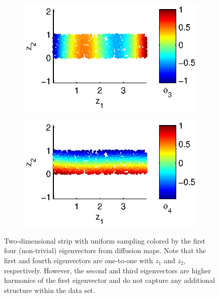 \documentclass[preprint]{elsarticle}
\begin{document}
\begin{figure}[t]
\begin{subfigure}{0.45\textwidth}
\includegraphics[width=\textwidth]{strip_discrete3}
\end{subfigure}
%
\begin{subfigure}{0.45\textwidth}
\includegraphics[width=\textwidth]{strip_discrete4}
\end{subfigure}
\caption{ Two-dimensional strip with uniform sampling colored by the first four (non-trivial) eigenvectors from diffusion maps. Note that the first and fourth eigenvectors are one-to-one with $z_1$ and $z_2$, respectively. However, the second and third eigenvectors are higher harmonics of the first eigenvector and do not capture any additional structure within the data set. }
\label{fig:strip_harmonics}
\end{figure}
\end{document}
